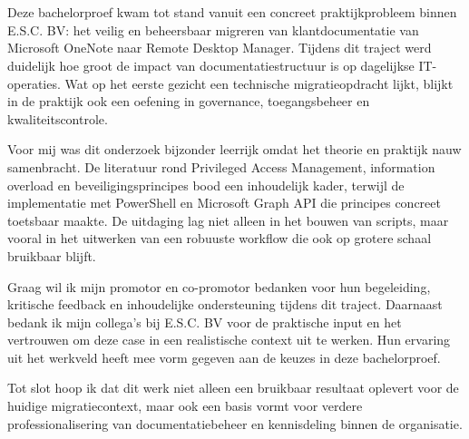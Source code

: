 
\chapter*{}%
\label{ch:voorwoord}


Deze bachelorproef kwam tot stand vanuit een concreet praktijkprobleem binnen E.S.C. BV: het veilig en beheersbaar migreren van klantdocumentatie van Microsoft OneNote naar Remote Desktop Manager. Tijdens dit traject werd duidelijk hoe groot de impact van documentatiestructuur is op dagelijkse IT-operaties. Wat op het eerste gezicht een technische migratieopdracht lijkt, blijkt in de praktijk ook een oefening in governance, toegangsbeheer en kwaliteitscontrole.

Voor mij was dit onderzoek bijzonder leerrijk omdat het theorie en praktijk nauw samenbracht. De literatuur rond Privileged Access Management, information overload en beveiligingsprincipes bood een inhoudelijk kader, terwijl de implementatie met PowerShell en Microsoft Graph API die principes concreet toetsbaar maakte. De uitdaging lag niet alleen in het bouwen van scripts, maar vooral in het uitwerken van een robuuste workflow die ook op grotere schaal bruikbaar blijft.

Graag wil ik mijn promotor en co-promotor bedanken voor hun begeleiding, kritische feedback en inhoudelijke ondersteuning tijdens dit traject. Daarnaast bedank ik mijn collega's bij E.S.C. BV voor de praktische input en het vertrouwen om deze case in een realistische context uit te werken. Hun ervaring uit het werkveld heeft mee vorm gegeven aan de keuzes in deze bachelorproef.

Tot slot hoop ik dat dit werk niet alleen een bruikbaar resultaat oplevert voor de huidige migratiecontext, maar ook een basis vormt voor verdere professionalisering van documentatiebeheer en kennisdeling binnen de organisatie.